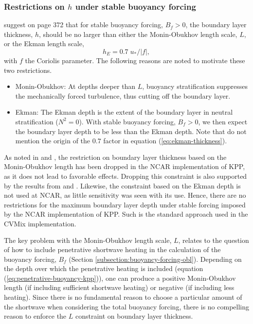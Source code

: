 \subsubsection{Restrictions on $h$ under stable buoyancy forcing}

\cite{LargeKPP} suggest on page 372 that for stable buoyancy forcing,
$B_{f} > 0$, the boundary layer thickness, $h$, should be no larger
than either the Monin-Obukhov length scale, $L$, or the Ekman
length scale, 
\begin{equation}
 h_{E} = 0.7 \; u_{*} /|f|,
\label{eq:ekman-thickness}
\end{equation} 
with $f$ the Coriolis parameter.  The following reasons are noted to
motivate these two restrictions.
\begin{itemize}
\item {\sc Monin-Obukhov}: At depths deeper than $L$, buoyancy
  stratification suppresses the mechanically forced turbulence, thus
  cutting off the boundary layer.

  \item {\sc Ekman}: The Ekman depth is the extent of the boundary
    layer in neutral stratification ($N^{2} = 0$).  With stable
    buoyancy forcing, $B_{f} > 0$, we then expect the boundary layer
    depth to be less than the Ekman depth.  Note that \cite{LargeKPP}
    do not mention the origin of the $0.7$ factor in equation
    (\ref{eq:ekman-thickness}).

\end{itemize}

As noted in \cite{LargeKPP} and \cite{Large_Gent1999}, the restriction
on boundary layer thickness based on the Monin-Obukhov length has been
dropped in the NCAR implementation of KPP, as it does not lead to
favorable effects.  Dropping this constraint is also supported by the
results from \cite{Shchepetkin2005} and \cite{Lemarie_etal2012a}.
Likewise, the constraint based on the Ekman depth is not used at NCAR,
as little sensitivity was seen with its use.  Hence, there are no
restrictions for the maximum boundary layer depth under stable forcing
imposed by the NCAR implementation of KPP.  Such is the standard
approach used in the CVMix implementation.

The key problem with the Monin-Obukhov length scale, $L$, relates to
the question of how to include penetrative shortwave heating in the
calculation of the buoyancy forcing, $B_{f}$ (Section
\ref{subsection:buoyancy-forcing-obl}).  Depending on the depth over
which the penetrative heating is included (equation
(\ref{eq:penetrative-buoyancy-kpp})), one can produce a positive
Monin-Obukhov length (if including sufficient shortwave heating) or
negative (if including less heating). Since there is no fundamental
reason to choose a particular amount of the shortwave when considering
the total buoyancy forcing, there is no compelling reason to enforce
the $L$ constraint on boundary layer thickness.


